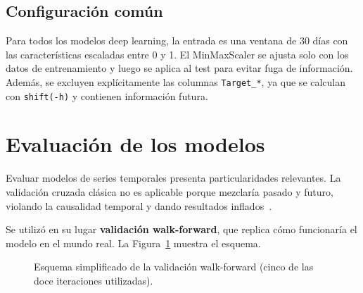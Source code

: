 \subsection{Configuración común}

Para todos los modelos deep learning, la entrada es una ventana de 30 días con las características escaladas entre 0 y 1. El MinMaxScaler se ajusta solo con los datos de entrenamiento y luego se aplica al test para evitar fuga de información. Además, se excluyen explícitamente las columnas \texttt{Target\_*}, ya que se calculan con \texttt{shift(-h)} y contienen información futura.

\section{Evaluación de los modelos}

Evaluar modelos de series temporales presenta particularidades relevantes. La validación cruzada clásica no es aplicable porque mezclaría pasado y futuro, violando la causalidad temporal y dando resultados inflados~\cite{hyndman2021forecasting}.

Se utilizó en su lugar \textbf{validación walk-forward}, que replica cómo funcionaría el modelo en el mundo real. La Figura~\ref{fig:walkforward} muestra el esquema.

\begin{figure}[H]
\centering
{}
\caption{Esquema simplificado de la validación walk-forward (cinco de las doce iteraciones utilizadas).}
\label{fig:walkforward}
\end{figure}

